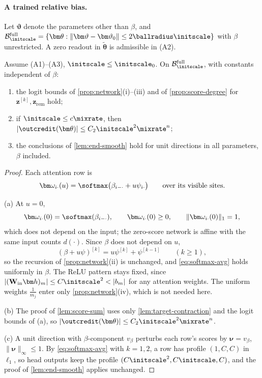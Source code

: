 \paragraph{A trained relative bias.} Let $\bm\vartheta$ denote the parameters other than $\beta$, and
$\mathcal B^{\mathrm{full}}_{\initscale}=\{\bm\theta:\|\bm\vartheta-\bm\vartheta_0\|\le2\ballradius\initscale\}$ with $\beta$ unrestricted. A zero readout in $\tilde{\bm\theta}$ is admissible in (A2).

\begin{lemma}
\label{lem:bias-uniform}
Assume (A1)--(A3), $\initscale\le\initscale_0$. On $\mathcal B^{\mathrm{full}}_{\initscale}$, with constants independent of $\beta$:
\begin{enumerate}[label=(\alph*),leftmargin=*,itemsep=1pt,topsep=2pt]
\item the logit bounds of \cref{prop:network}(i)--(iii) and of \cref{prop:score-degree} for $\bm z^{[k]},\bm z_{\mathrm{rem}}$ hold;
\item if $\initscale\le c\mixrate$, then $|\outcredit(\bm\theta)|\le C_2\initscale^2\mixrate^n$;
\item the conclusions of \cref{lem:end-smooth} hold for unit directions in all parameters, $\beta$ included.
\end{enumerate}
\end{lemma}

\begin{proof}
Each attention row is
\[
 \bm\omega_{i\cdot}(u)=\softmax\bigl(\beta_{i-\cdot}+u\psi_{i\cdot}\bigr)\qquad\text{over its visible sites.}
\]

\noindent(a) At $u=0$,
\[
 \bm\omega_{i\cdot}(0)=\softmax(\beta_{i-\cdot}),\qquad \bm\omega_{i\cdot}(0)\ge0,\qquad \|\bm\omega_{i\cdot}(0)\|_1=1,
\]
which does not depend on the input; the zero-score network is affine with the same input counts $d(\cdot)$. Since $\beta$ does not
depend on $u$,
\[
 (\beta+u\psi)^{[k]}=u\psi^{[k]}+\psi^{[k-1]}\qquad(k\ge1),
\]
so the recursion of \cref{prop:network}(ii) is unchanged, and \cref{eq:softmax-avg} holds uniformly in $\beta$. The ReLU pattern stays
fixed, since $|(\mathbf W_{\mathrm{in}}\bm h)_m|\le C\initscale^2<|b_m|$ for any attention weights. The uniform weights $\frac{1}{m_j}$ enter only
\cref{prop:network}(iv), which is not needed here.

\smallskip\noindent(b) The proof of \cref{lem:score-sum} uses only \cref{lem:target-contraction} and the logit bounds of (a), so
$|\outcredit(\bm\theta)|\le C_2\initscale^2\mixrate^n$.

\smallskip\noindent(c) A unit direction with $\beta$-component $v_\beta$ perturbs each row's scores by $\bm\nu=v_\beta$, $\|\bm\nu\|_\infty\le1$. By
\cref{eq:softmax-avg} with $k=1,2$, a row has profile $(1,C,C)$ in $\ell_1$, so head outputs keep the profile $(C\initscale^2,C\initscale,C)$, and the
proof of \cref{lem:end-smooth} applies unchanged.
\end{proof}

